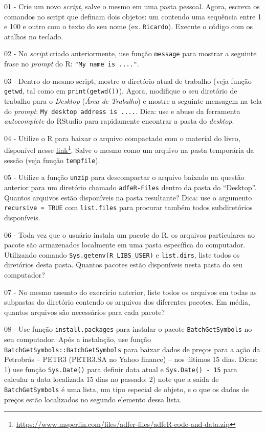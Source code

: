 \documentclass[
  11pt,
]{book}
\begin{document}
01 -
Crie um novo \emph{script}, salve o mesmo em uma pasta pessoal. Agora, escreva os comandos no script que definam dois objetos: um contendo uma sequência entre 1 e 100 e outro com o texto do seu nome (ex. \texttt{\textquotesingle{}Ricardo\textquotesingle{}}). Execute o código com os atalhos no teclado.

02 -
No \emph{script} criado anteriormente, use função \texttt{message} para mostrar a seguinte frase no \emph{prompt} do R: \texttt{"My\ name\ is\ ...."}.

03 -
Dentro do mesmo script, mostre o diretório atual de trabalho (veja função \texttt{getwd}, tal como em \texttt{print(getwd())}). Agora, modifique o seu diretório de trabalho para o \emph{Desktop} (\emph{Área de Trabalho}) e mostre a seguinte mensagem na tela do \emph{prompt}: \texttt{\textquotesingle{}My\ desktop\ address\ is\ ....\textquotesingle{}}. Dica: use e abuse da ferramenta \emph{autocomplete} do RStudio para rapidamente encontrar a pasta do \emph{desktop}.

04 -
Utilize o R para baixar o arquivo compactado com o material do livro, disponível nesse \href{https://www.msperlin.com/files/adfer-files/adfeR-code-and-data.zip}{link}\footnote{\url{https://www.msperlin.com/files/adfer-files/adfeR-code-and-data.zip}}. Salve o mesmo como um arquivo na pasta temporária da sessão (veja função \texttt{tempfile}).

05 -
Utilize a função \texttt{unzip} para descompactar o arquivo baixado na questão anterior para um diretório chamado \texttt{\textquotesingle{}adfeR-Files\textquotesingle{}} dentro da pasta do ``Desktop''. Quantos arquivos estão disponíveis na pasta resultante? Dica: use o argumento \texttt{recursive\ =\ TRUE} com \texttt{list.files} para procurar também todos subdiretórios disponíveis.

06 -
Toda vez que o usuário instala um pacote do R, os arquivos particulares ao pacote são armazenados localmente em uma pasta específica do computador. Utilizando comando \texttt{Sys.getenv(\textquotesingle{}R\_LIBS\_USER\textquotesingle{})} e \texttt{list.dirs}, liste todos os diretórios desta pasta. Quantos pacotes estão disponíveis nesta pasta do seu computador?

07 -
No mesmo assunto do exercício anterior, liste todos os arquivos em todas as subpastas do diretório contendo os arquivos dos diferentes pacotes. Em média, quantos arquivos são necessários para cada pacote?

08 -
Use função \texttt{install.packages} para instalar o pacote \texttt{BatchGetSymbols} no seu computador. Após a instalação, use função \texttt{BatchGetSymbols::BatchGetSymbols} para baixar dados de preços para a ação da Petrobrás -- PETR3 (PETR3.SA no Yahoo finance) -- nos últimos 15 dias. Dicas: 1) use função \texttt{Sys.Date()} para definir data atual e \texttt{Sys.Date()\ -\ 15} para calcular a data localizada 15 dias no passado; 2) note que a saída de \texttt{BatchGetSymbols} é uma lista, um tipo especial de objeto, e o que os dados de preços estão localizados no segundo elemento dessa lista.
\end{document}
